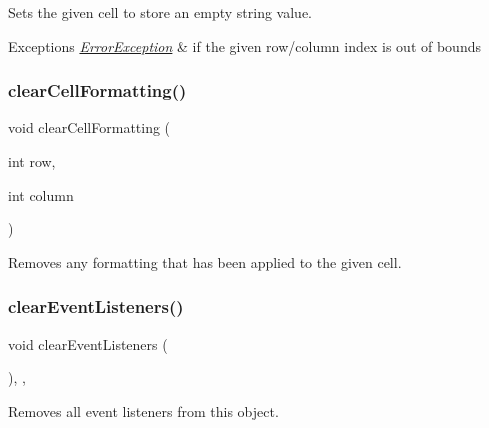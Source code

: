 Sets the given cell to store an empty string value. 


\begin{DoxyExceptions}{Exceptions}
{\em \mbox{\hyperlink{classErrorException}{Error\+Exception}}} & if the given row/column index is out of bounds \\
\hline
\end{DoxyExceptions}
\mbox{\label{classGTable_a5ba4fe558e9d315c123ecd9e896065ca}} 
\subsubsection{\texorpdfstring{clear\+Cell\+Formatting()}{clearCellFormatting()}}
{\footnotesize\ttfamily void clear\+Cell\+Formatting (\begin{DoxyParamCaption}\item[{int}]{row,  }\item[{int}]{column }\end{DoxyParamCaption})\hspace{0.3cm}{\ttfamily [virtual]}}



Removes any formatting that has been applied to the given cell. 

\mbox{\label{classGObservable_a80cfa040459ff53594adbd6a51ec8f43}} 
\subsubsection{\texorpdfstring{clear\+Event\+Listeners()}{clearEventListeners()}}
{\footnotesize\ttfamily void clear\+Event\+Listeners (\begin{DoxyParamCaption}{ }\end{DoxyParamCaption})\hspace{0.3cm}{\ttfamily [protected]}, {\ttfamily [virtual]}, {\ttfamily [inherited]}}



Removes all event listeners from this object. 

\mbox{\label{classGTable_a07ea41be0cdc43ffcd09898d3ae5c523}} 
